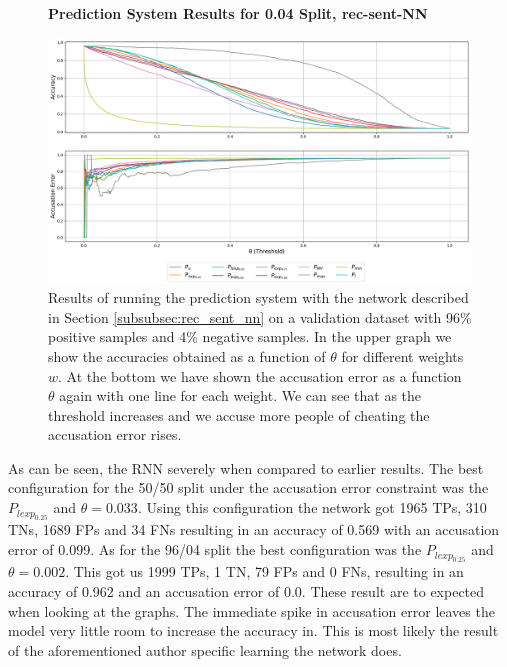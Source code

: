 \begin{figure}
    \centering
    \textbf{Prediction System Results for 0.04 Split, \glsdesc{rec-sent-NN}}\par\medskip
    \includegraphics[scale=0.33]{./pictures/experiments/rec_sent_nn/prediction_system_04}
    \caption{Results of running the prediction system with the network described
        in Section \ref{subsubsec:rec_sent_nn} on a validation dataset
        with 96\% positive samples and 4\% negative samples. In the upper graph
        we show the accuracies obtained as a function of $\theta$ for different
        weights $w$. At the bottom we have shown the accusation error as a
        function $\theta$ again with one line for each weight. We can see that
        as the threshold increases and we accuse more people of cheating the
        accusation error rises.}
    \label{fig:rec-sent-NN-pred-4}
\end{figure}

As can be seen, the \gls{RNN} severely when compared to earlier results. The
best configuration for the 50/50 split under the accusation error constraint was
the $P_{lexp_{0.25}}$ and $\theta = 0.033$. Using this configuration the network
got 1965 \gls{TP}s, 310 \gls{TN}s, 1689 \gls{FP}s and 34 \gls{FN}s resulting in
an accuracy of 0.569 with an accusation error of 0.099. As for the 96/04 split
the best configuration was the $P_{lexp_{0.25}}$ and $\theta = 0.002$. This got
us 1999 \gls{TP}s, 1 \gls{TN}, 79 \gls{FP}s and 0 \gls{FN}s, resulting in an
accuracy of 0.962 and an accusation error of 0.0. These result are to expected
when looking at the graphs. The immediate spike in accusation error leaves the
model very little room to increase the accuracy in. This is most likely the
result of the aforementioned author specific learning the network does.


